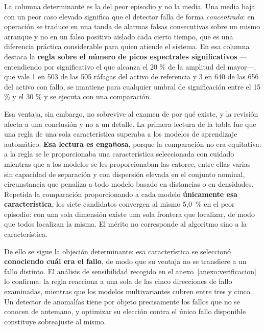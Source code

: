 La columna determinante es la del peor episodio y no la media. Una media baja con un peor caso
elevado significa que el detector falla de forma \textit{concentrada}: en operación se traduce en
una tanda de alarmas falsas consecutivas sobre un mismo arranque y no en un falso positivo
aislado cada cierto tiempo, que es una diferencia práctica considerable para quien atiende el
sistema. En esa columna destaca la \textbf{regla sobre el número de picos espectrales
significativos} —entendiendo por significativo el que alcanza el 20 \% de la amplitud del
mayor—, que vale 1 en 503 de las 505 ráfagas del activo de referencia y 3 en 640 de las 656 del
activo con fallo, se mantiene para cualquier umbral de significación entre el 15 \% y el 30 \% y
se ejecuta con una comparación.

Esa ventaja, sin embargo, no sobrevive al examen de por qué existe, y la revisión afecta a una
conclusión y no a un detalle. La primera lectura de la tabla fue que una regla de una sola
característica superaba a los modelos de aprendizaje automático. \textbf{Esa lectura es
engañosa}, porque la comparación no era equitativa: a la regla se le proporcionaba una
característica seleccionada con cuidado mientras que a los modelos se les proporcionaban las
catorce, entre ellas varias sin capacidad de separación y con dispersión elevada en el conjunto
nominal, circunstancia que penaliza a todo modelo basado en distancias o en densidades. Repetida
la comparación proporcionando a cada modelo \textbf{únicamente esa característica}, los siete
candidatos convergen al mismo \mbox{5,0 \%} en el peor episodio: con una sola dimensión existe
una sola frontera que localizar, de modo que todos localizan la misma. El mérito no corresponde
al algoritmo sino a la característica.

De ello se sigue la objeción determinante: esa característica se seleccionó \textbf{conociendo
cuál era el fallo}, de modo que su ventaja no se transfiere a un fallo distinto. El análisis de
sensibilidad recogido en el anexo~\ref{anexo:verificacion} lo confirma: la regla reacciona a una
sola de las cinco direcciones de fallo examinadas, mientras que los modelos multivariantes
cubren entre tres y cinco. Un detector de anomalías tiene por objeto precisamente los fallos que
no se conocen de antemano, y optimizar su elección contra el único fallo disponible constituye
sobreajuste al mismo.

